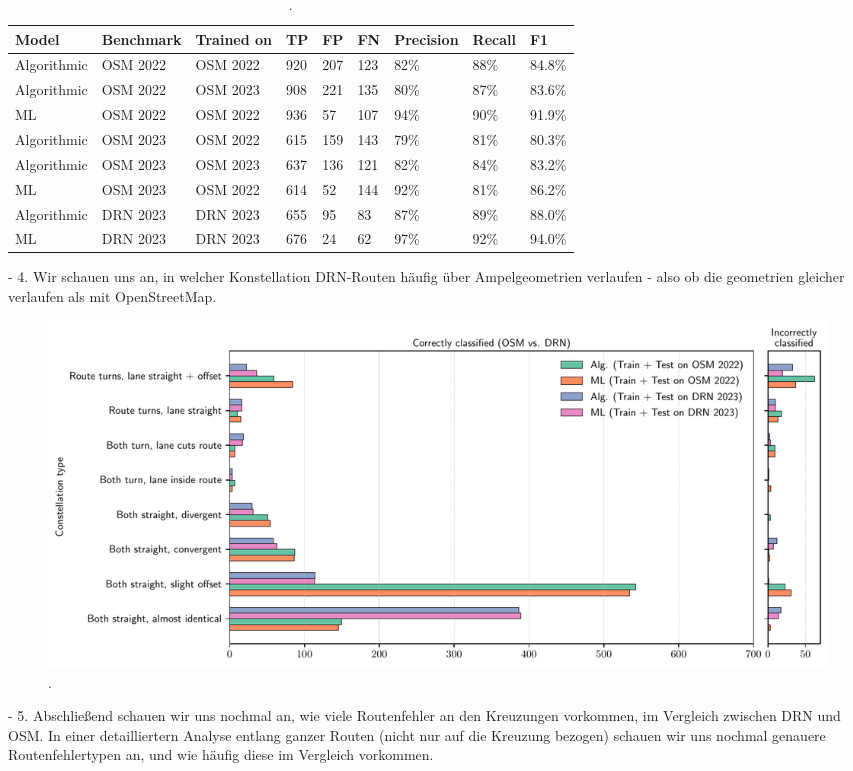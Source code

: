 \begin{table}[h]
\caption{.}
\begin{tabular}{@{}lllllllll@{}}
\toprule
  \textbf{Model} & \textbf{Benchmark} & \textbf{Trained on} & \textbf{TP} & \textbf{FP} & \textbf{FN} & \textbf{Precision} & \textbf{Recall} & \textbf{F1} \\
  \midrule
  Algorithmic & OSM 2022 & OSM 2022 & 920 & 207 & 123 & 82\% & 88\% & 84.8\% \\
  Algorithmic & OSM 2022 & OSM 2023 & 908 & 221 & 135 & 80\% & 87\% & 83.6\% \\
  ML          & OSM 2022 & OSM 2022 & 936 & 57 & 107 & 94\% & 90\% & 91.9\% \\
  \midrule
  Algorithmic & OSM 2023 & OSM 2022 & 615 & 159 & 143 & 79\% & 81\% & 80.3\% \\
  Algorithmic & OSM 2023 & OSM 2023 & 637 & 136 & 121 & 82\% & 84\% & 83.2\% \\
  ML          & OSM 2023 & OSM 2022 & 614 & 52 & 144 & 92\% & 81\% & 86.2\% \\
  \midrule
  Algorithmic & DRN 2023 & DRN 2023 & 655 & 95 & 83 & 87\% & 89\% & 88.0\% \\
  ML          & DRN 2023 & DRN 2023 & 676 & 24 & 62 & 97\% & 92\% & 94.0\% \\
\bottomrule
\end{tabular}
\label{tab:model-scores-drn}
\end{table}

- 4. Wir schauen uns an, in welcher Konstellation DRN-Routen häufig über Ampelgeometrien verlaufen - also ob die geometrien gleicher verlaufen als mit OpenStreetMap.

\begin{figure}[htbp]
\centering 
\includegraphics[width=\linewidth]{images/matching-constellations-osm-vs-drn.pdf}
\caption{.}
\label{fig:}
\end{figure}

- 5. Abschließend schauen wir uns nochmal an, wie viele Routenfehler an den Kreuzungen vorkommen, im Vergleich zwischen DRN und OSM. In einer detailliertern Analyse entlang ganzer Routen (nicht nur auf die Kreuzung bezogen) schauen wir uns nochmal genauere Routenfehlertypen an, und wie häufig diese im Vergleich vorkommen.

